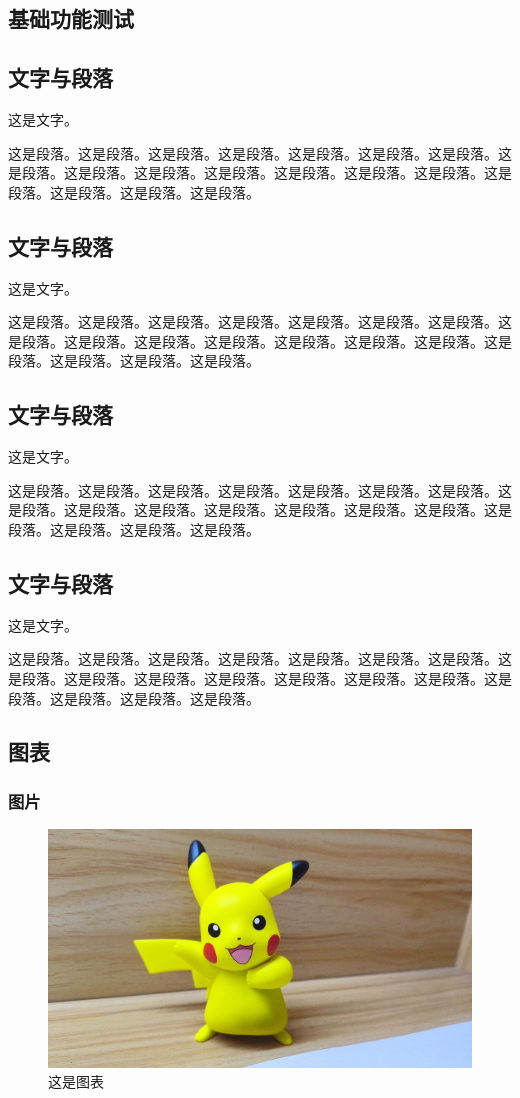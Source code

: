 \begin{ujnbody}
    \subsection{基础功能测试}
    \subsection{文字与段落}
    这是文字。

    这是段落。这是段落。这是段落。这是段落。这是段落。这是段落。这是段落。这是段落。这是段落。这是段落。这是段落。这是段落。这是段落。这是段落。这是段落。这是段落。这是段落。这是段落。
    \subsection{文字与段落}
    这是文字。

    这是段落。这是段落。这是段落。这是段落。这是段落。这是段落。这是段落。这是段落。这是段落。这是段落。这是段落。这是段落。这是段落。这是段落。这是段落。这是段落。这是段落。这是段落。
    \subsection{文字与段落}
    这是文字。

    这是段落。这是段落。这是段落。这是段落。这是段落。这是段落。这是段落。这是段落。这是段落。这是段落。这是段落。这是段落。这是段落。这是段落。这是段落。这是段落。这是段落。这是段落。
    \subsection{文字与段落}
    这是文字。

    这是段落。这是段落。这是段落。这是段落。这是段落。这是段落。这是段落。这是段落。这是段落。这是段落。这是段落。这是段落。这是段落。这是段落。这是段落。这是段落。这是段落。这是段落。
    \subsection{图表}

    \subsubsection{图片}

    \begin{figure}[htbp]
        \centering
        \includegraphics[scale=0.1, ]{figures/pikachu.jpg}
        \caption{这是图表}
    \end{figure}


\end{ujnbody}
